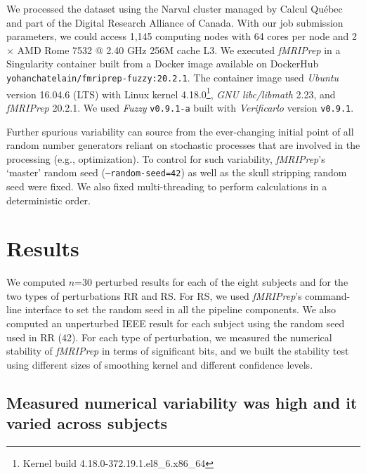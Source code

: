\documentclass[lettersize,journal]{IEEEtran}
\newcommand{\fmriprep}{\emph{fMRIPrep}\xspace}
\begin{document}
{%
We processed the dataset using the Narval cluster managed by Calcul Qu\'ebec and part of the Digital Research Alliance of Canada.
With our job submission parameters, we could access 1,145 computing nodes with 64 cores per node and 2 $\times$ AMD Rome 7532 @ 2.40 GHz 256M cache L3. We executed \fmriprep in a Singularity container built from a Docker image available on DockerHub \texttt{yohanchatelain/fmriprep-fuzzy:20.2.1}.
The container image used \emph{Ubuntu} version 16.04.6 (LTS) with Linux kernel 4.18.0\footnote{Kernel build 4.18.0-372.19.1.el8\_6.x86\_64}, \emph{GNU libc/libmath} 2.23, and \fmriprep 20.2.1.
We used \emph{Fuzzy} \texttt{v0.9.1-a} built with \emph{Verificarlo} version \texttt{v0.9.1}.

Further spurious variability can source from the ever-changing initial point of all random number generators reliant on stochastic processes that are involved in the processing (e.g., optimization).
To control for such variability, \fmriprep's `master' random seed (\texttt{--random-seed=42}) as well as the skull stripping random seed were fixed. We also fixed multi-threading to perform calculations in a deterministic order.


\section{Results}

We computed $n$=30 perturbed results for each of the eight subjects and for the two types of perturbations RR and RS. For RS, we used \fmriprep's command-line interface to set the random seed in all the pipeline components. We also computed an unperturbed IEEE result for each subject using the random seed used in RR (42). For each type of perturbation, we measured the numerical stability of \fmriprep in terms of significant bits, and we built the stability test using different sizes of smoothing kernel and different confidence levels.

\subsection{Measured numerical variability was high and it varied across subjects}

}
\end{document}
